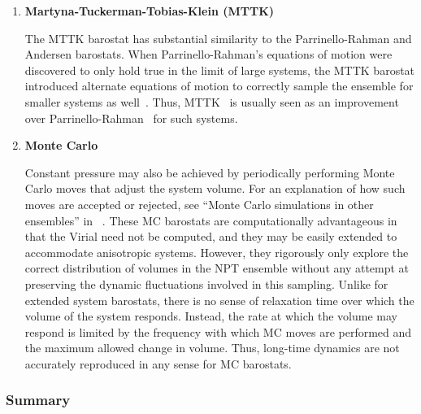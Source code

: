 \documentclass[9pt,bestpractices]{livecoms}
\begin{document}
\begin{enumerate}[listparindent=\parindent]
    \item \textbf{Martyna-Tuckerman-Tobias-Klein (MTTK)}
    
        The MTTK barostat has substantial similarity to the Parrinello-Rahman and Andersen barostats.
        When Parr\-inello-Rah\-man's equations of motion were discovered to only hold true in the limit of large systems, the MTTK barostat introduced alternate equations of motion to correctly sample the ensemble for smaller systems as well~\cite{martyna1994constant, martyna1996explicit}.
        Thus, MTTK~\cite{martyna1994constant, martyna1996explicit} is usually seen as an improvement over Parrinello-Rahman~\cite{Parrinello1981} for such systems.

    \item \textbf{Monte Carlo}
    
        Constant pressure may also be achieved by periodically performing Monte Carlo moves that adjust the system volume.
        For an explanation of how such moves are accepted or rejected, see ``Monte Carlo simulations in other ensembles'' in ~\citet{ShellNotes}.
        These MC barostats are computationally advantageous in that the Virial need not be computed, and they may be easily extended to accommodate anisotropic systems.
        However, they rigorously only explore the correct distribution of volumes in the NPT ensemble without any attempt at preserving the dynamic fluctuations involved in this sampling.
        Unlike for extended system barostats, there is no sense of relaxation time over which the volume of the system responds.
        Instead, the rate at which the volume may respond is limited by the frequency with which MC moves are performed and the maximum allowed change in volume.
        Thus, long-time dynamics are not accurately reproduced in any sense for MC barostats.

\end{enumerate}

\subsubsection{Summary}
\end{document}
